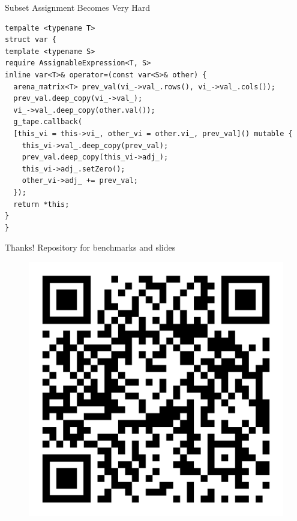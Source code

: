 \documentclass[dvipsnames]{beamer}
\begin{document}
\begin{frame}[fragile]{Subset Assignment Becomes Very Hard}
\begin{verbatim}
tempalte <typename T>
struct var {
template <typename S>
require AssignableExpression<T, S>
inline var<T>& operator=(const var<S>& other) {
  arena_matrix<T> prev_val(vi_->val_.rows(), vi_->val_.cols());
  prev_val.deep_copy(vi_->val_);
  vi_->val_.deep_copy(other.val());
  g_tape.callback(
  [this_vi = this->vi_, other_vi = other.vi_, prev_val]() mutable {
    this_vi->val_.deep_copy(prev_val);
    prev_val.deep_copy(this_vi->adj_);
    this_vi->adj_.setZero();
    other_vi->adj_ += prev_val;
  });
  return *this;
}
}
\end{verbatim}
\end{frame}

\begin{frame}{Thanks!}
Repository for benchmarks and slides
\begin{figure}
\centerline{\includegraphics[scale=.1]{img/qr-code.png}}
\label{fig-qr-code}
\end{figure}
\end{frame}
\end{document}
